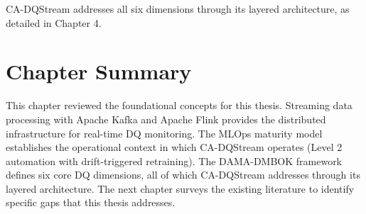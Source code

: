 CA-DQStream addresses all six dimensions through its layered architecture, as detailed in Chapter 4.

\section{Chapter Summary}

This chapter reviewed the foundational concepts for this thesis. Streaming data processing with Apache Kafka and Apache Flink provides the distributed infrastructure for real-time DQ monitoring. The MLOps maturity model establishes the operational context in which CA-DQStream operates (Level 2 automation with drift-triggered retraining). The DAMA-DMBOK framework defines six core DQ dimensions, all of which CA-DQStream addresses through its layered architecture. The next chapter surveys the existing literature to identify specific gaps that this thesis addresses.
